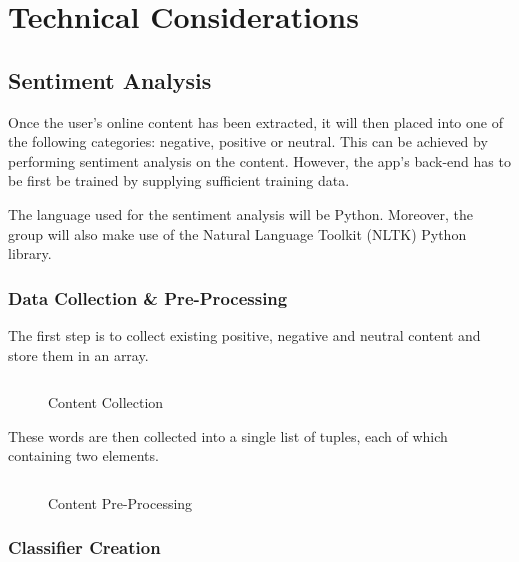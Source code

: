 \section{Technical Considerations}

\subsection{Sentiment Analysis}

Once the user's online content has been extracted, it will then placed into one of the following categories: negative, positive or neutral. This can be achieved by performing sentiment analysis on the content. However, the app's back-end has to be first be trained by supplying sufficient training data.

The language used for the sentiment analysis will be Python. Moreover, the group will also make use of the Natural Language Toolkit (NLTK) Python library.

\subsubsection{Data Collection \& Pre-Processing}

The first step is to collect existing positive, negative and neutral content and store them in an array.

\begin{figure}
  \centering
  \begin{minipage}{14cm}
    \centering
    \inputminted[fontsize=\footnotesize]{python}{inc/snippets/collection.py}
    \caption{Content Collection}
    \label{fig:sentiment_analysis_step1a}
  \end{minipage}
\end{figure}

These words are then collected into a single list of tuples, each of which containing two elements.

\begin{figure}
  \centering
  \begin{minipage}{14cm}
    \centering
    \inputminted[fontsize=\footnotesize]{python}{inc/snippets/collection_iteration.py}
    \caption{Content Pre-Processing}
    \label{fig:sentiment_analysis_step1b}
  \end{minipage}
\end{figure}

\subsubsection{Classifier Creation}

